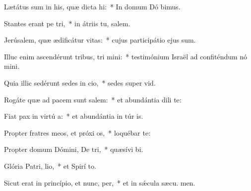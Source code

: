 \item Lætátus sum in his, quæ dicta  hi:~* In domum Dó bimus.
\item Stantes erant pe tri,~* in átriis tu, salem.
\item Jerúsalem, quæ ædificátur  vitas:~* cujus participátio ejus  sum.
\item Illuc enim ascendérunt tribus, tri mini:~* testimónium Israël ad confiténdum nó mini.
\item Quia illic sedérunt sedes in cio,~* sedes super  vid.
\item Rogáte quæ ad pacem sunt salem:~* et abundántia dili te:
\item Fiat pax in virtú a:~* et abundántia in túr is.
\item Propter fratres meos, et próxi os,~* loquébar   te:
\item Propter domum Dómini, De tri,~* quæsívi  bi.
\item Glória Patri,  lio,~* et Spirí to.
\item Sicut erat in princípio, et nunc,  per,~* et in sǽcula sæcu. men.
